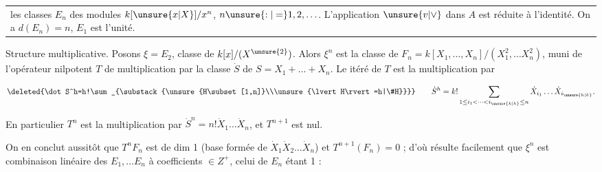 
\noindent\begin{tabular}{@{}|p{.92\linewidth}@{}}les classes $E_n$ des modules $k[\unsure{x|X}]/x^n$, $n\unsure{:|=}1,2,\ldots$. L'application $\unsure{v|\vee}$ dans $A$ est réduite à l'identité. On a $d(E_n)=n$, $E_1$ est l'unité.\end{tabular}

Structure multiplicative. Posons $\xi=E_2$, classe de $k[x]/(X^{\unsure{2}})$. Alors $\xi^n$ est la classe de $F_n=k[X_1,\ldots,X_n]/(X_1^2,\ldots X_n^2)$, muni de l'opérateur nilpotent $T$ de multiplication par la classe $\dot S$ de $S=X_1+\ldots+X_n$.  Le  itéré  de $T$ est la multiplication par

\[ \deleted{\dot S^h=h!\sum_{\substack{\unsure{H\subset[1,n]}\\\unsure{\lvert H\rvert=h|\#H}}}}\qquad \dot S^h=k!\sum_{1\leq i_1<\cdots<i_{\unsure{k|h}}\leq n}\dot X_{i_1}\ldots\dot X_{i_{\unsure{h|k}}}. \]

En particulier $T^n$ est la multiplication par $\dot S^n=n!\dot X_1\ldots\dot X_n$, et $T^{n+1}$ est nul.

On en conclut aussitôt que $T^n F_n$ est de dim 1 (base formée de $\dot X_1\dot X_2\ldots\dot X_n$) et $T^{n+1}(F_n)=0$ ; d'où résulte facilement que  $\xi^n$ est combinaison linéaire des $E_1,\ldots E_n$ à coefficients $\in Z^+$, celui de $E_n$ étant 1 :


